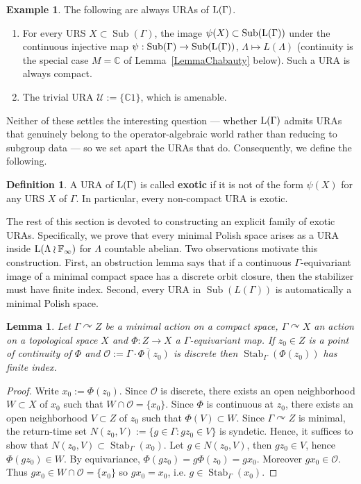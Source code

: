 \documentclass[12pt]{amsart} %
\theoremstyle{plain}
\newtheorem{lemma}[theorem]{Lemma}
\theoremstyle{definition}
\newtheorem{definition}[theorem]{Definition}
\newtheorem{example}[theorem]{Example}
\newcommand{\C}{\mathbb{C}}
\DeclareMathOperator{\Sub}{Sub}
\begin{document}
\begin{example}\label{ExBasic}The following are always URAs of ${\rm L}(\Gamma)$.
\begin{enumerate}
    \item For every URS $X\subset\Sub(\Gamma)$, the image $\psi(X)\subset\Sub({\rm L}(\Gamma))$ under the continuous injective map $\psi:\Sub(\Gamma)\rightarrow\Sub({\rm L}(\Gamma))$, $\Lambda\mapsto L(\Lambda)$ (continuity is the special case $M=\C$ of Lemma~\ref{LemmaChabauty} below). Such a URA is always compact.
    \item The trivial URA $\mathcal{U}:=\{\C 1\}$, which is amenable.
\end{enumerate}
\end{example}
Neither of these settles the interesting question --- whether ${\rm L}(\Gamma)$ admits URAs that genuinely belong to the operator-algebraic world rather than reducing to subgroup data --- so we set apart the URAs that do. Consequently, we define the following.
\begin{definition}\label{def:exotic}
A URA of ${\rm L}(\Gamma)$ is called \textbf{exotic} if it is not of the form $\psi(X)$ for any URS $X$ of $\Gamma$. In particular, every non-compact URA is exotic.
\end{definition}
The rest of this section is devoted to constructing an explicit family of exotic URAs. Specifically, we prove that every minimal Polish space arises as a URA inside ${\rm L}(\Lambda \wr \mathbb F_\infty)$ for $\Lambda$ countable abelian. Two observations motivate this construction. First, an obstruction lemma says that if a continuous $\Gamma$-equivariant image of a minimal compact space has a discrete orbit closure, then the stabilizer must have finite index. Second, every URA in $\Sub(L(\Gamma))$ is automatically a minimal Polish space.
\begin{lemma}\label{LemObstruction}
Let \(\Gamma\curvearrowright Z\) be a minimal action on a compact space, \(\Gamma\curvearrowright X\) an action on a topological space $X$ and $\Phi:Z\to X$ a \(\Gamma\)-equivariant map. If \(z_0\in Z\) is a point of continuity of
\(\Phi\) and $\mathcal O:=\overline{\Gamma\cdot \Phi(z_0)}$ is discrete then $\operatorname{Stab}_\Gamma(\Phi(z_0))$ has finite index.
\end{lemma}
\begin{proof}
Write $x_0:=\Phi(z_0)$. Since \(\mathcal O\) is discrete, there exists an open neighborhood
\(W\subset X\) of \(x_0\) such that $W\cap\mathcal O=\{x_0\}$. Since \(\Phi\) is continuous at \(z_0\), there exists an open neighborhood
\(V\subset Z\) of \(z_0\) such that $\Phi(V)\subset W$. Since $\Gamma\curvearrowright Z$ is minimal, the return-time set $N(z_0,V):=\{g\in\Gamma:gz_0\in V\}$ is syndetic. Hence, it suffices to show that $N(z_0,V)\subset \operatorname{Stab}_\Gamma(x_0)$. Let \(g\in N(z_0,V)\), then \(gz_0\in V\), hence $\Phi(gz_0)\in W$. By equivariance, $\Phi(gz_0)=g\Phi(z_0)=gx_0$. Moreover \(gx_0\in\mathcal O\). Thus $gx_0\in W\cap\mathcal O=\{x_0\}$ so \(gx_0=x_0\), i.e. $g\in\operatorname{Stab}_\Gamma(x_0)$.\end{proof}
\end{document}
